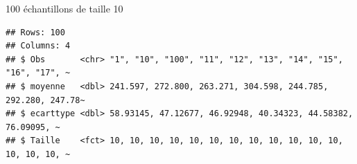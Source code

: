 \documentclass[ignorenonframetext,]{beamer}
\newenvironment{Shaded}{\begin{snugshade}}{\end{snugshade}}
\newcommand{\KeywordTok}[1]{\textcolor[rgb]{0.13,0.29,0.53}{\textbf{#1}}}
\newcommand{\DataTypeTok}[1]{\textcolor[rgb]{0.13,0.29,0.53}{#1}}
\newcommand{\StringTok}[1]{\textcolor[rgb]{0.31,0.60,0.02}{#1}}
\newcommand{\OtherTok}[1]{\textcolor[rgb]{0.56,0.35,0.01}{#1}}
\newcommand{\OperatorTok}[1]{\textcolor[rgb]{0.81,0.36,0.00}{\textbf{#1}}}
\newcommand{\NormalTok}[1]{#1}
\begin{document}
\begin{frame}[fragile]{100 échantillons de taille 10}

\begin{Shaded}
\end{Shaded}

\begin{verbatim}
## Rows: 100
## Columns: 4
## $ Obs       <chr> "1", "10", "100", "11", "12", "13", "14", "15", "16", "17", ~
## $ moyenne   <dbl> 241.597, 272.800, 263.271, 304.598, 244.785, 292.280, 247.78~
## $ ecarttype <dbl> 58.93145, 47.12677, 46.92948, 40.34323, 44.58382, 76.09095, ~
## $ Taille    <fct> 10, 10, 10, 10, 10, 10, 10, 10, 10, 10, 10, 10, 10, 10, 10, ~
\end{verbatim}

\end{frame}
\end{document}
